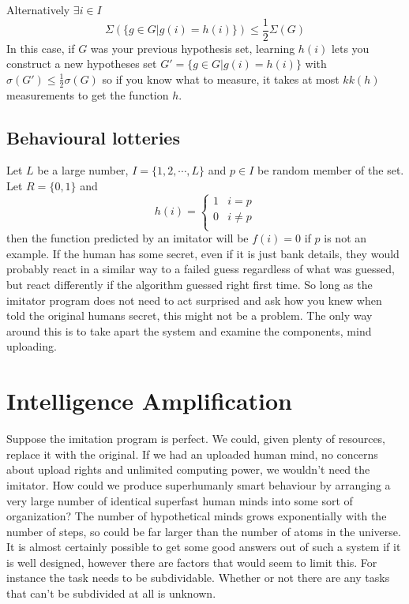 \documentclass[12pt]{article}
\begin{document}
Alternatively  $\exists i\in I$
$$\Sigma(\lbrace g\in G|g(i)=h(i)\rbrace) \leq\frac12\Sigma(G)$$
In this case, if $G$ was your previous hypothesis set, learning $h(i)$ lets you construct a new hypotheses set $G'=\lbrace g\in G|g(i)=h(i)\rbrace$ with $\sigma(G')\leq\frac12 \sigma(G)$ so if you know what to measure, it takes at most $kk(h)$ measurements to get the function $h$.

\subsection{Behavioural lotteries}
Let $L$ be a large number, $I=\lbrace 1,2,\cdots ,L\rbrace$ and $p\in I$ be random member of the set. Let $R=\lbrace 0,1 \rbrace$ and
$$h(i)=\left\lbrace \begin{array}{ll}
1&i=p\\
0&i\neq p\\
\end{array}\right. $$ then the function predicted by an imitator will be $f(i)=0$ if $p$ is not an example. If the human has some secret, even if it is just bank details, they would probably react in a similar way to a failed guess regardless of what was guessed, but react differently if the algorithm guessed right first time. So long as the imitator program does not need to act surprised and ask how you knew when told the original humans secret, this might not be a problem. The only way around this is to take apart the system and examine the components, mind uploading.
\section{Intelligence Amplification}
Suppose the imitation program is perfect. We could, given plenty of resources, replace it with the original. If we had an uploaded human mind, no concerns about upload rights and unlimited computing power, we wouldn't need the imitator. How could we produce superhumanly smart behaviour by arranging a very large number of identical superfast human minds into some sort of organization? The number of hypothetical minds grows exponentially with the number of steps, so could be far larger than the number of atoms in the universe.
It is almost certainly possible to get some good answers out of such a system if it is well designed, however there are factors that would seem to limit this. For instance the task needs to be subdividable. Whether or not there are any tasks that can't be subdivided at all is unknown.
\end{document}
